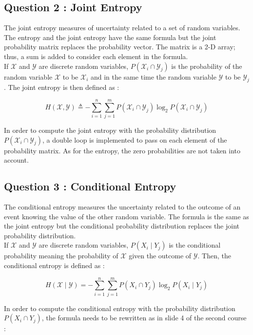 \documentclass[titlepage]{article}
\begin{document}
\subsection*{Question 2 : Joint Entropy}

The joint entropy measures of uncertainty related to a set of random variables. The entropy and the joint entropy have the same formula but the joint probability matrix replaces the probability vector. The matrix is a 2-D array; thus, a sum is added to consider each element in the formula. \\

If $\mathcal{X}$ and $\mathcal{Y}$ are discrete random variables, $P\left(\mathcal{X}_i \cap \mathcal{Y}_j\right)$ is the probability of the random variable $\mathcal{X}$ to be $\mathcal{X}_i$ and in the same time the random variable $\mathcal{Y}$ to be $\mathcal{Y}_j$. The joint entropy is then defined as : 

$$H(\mathcal{X}, \mathcal{Y}) \triangleq-\sum_{i=1}^n \sum_{j=1}^m P\left(\mathcal{X}_i \cap \mathcal{Y}_j\right) \log_2 P\left(\mathcal{X}_i \cap \mathcal{Y}_j\right)$$

In order to compute the joint entropy with the probability distribution $P\left(\mathcal{X}_i \cap \mathcal{Y}_j\right)$, a double loop is implemented to pass on each element of the probability matrix. As for the entropy, the zero probabilities are not taken into account. 

\subsection*{Question 3 : Conditional Entropy}
The conditional entropy measures the uncertainty related to the outcome of an event knowing the value of the other random variable. The formula is the same as the joint entropy but the conditional probability distribution replaces the joint probability distribution. \\

If $\mathcal{X}$ and $\mathcal{Y}$ are discrete random variables, $P\left(X_i \mid Y_j\right)$ is the conditional probability meaning the probability of $\mathcal{X}$ given the outcome of $\mathcal{Y}$. Then, the conditional entropy is defined as : 

$$H(\mathcal{X} \mid \mathcal{Y})=-\sum_{i=1}^n \sum_{j=1}^m P\left(X_i \cap Y_j\right) \log_2 P\left(X_i \mid Y_j\right)$$

In order to compute the conditional entropy with the probability distribution $P\left(X_i \cap Y_j\right)$, the formula needs to be rewritten as in slide 4 of the second course : 
\end{document}
